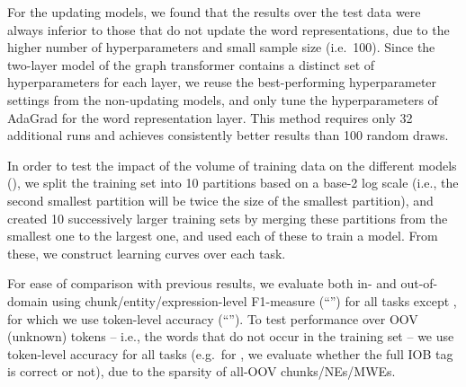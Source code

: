 For the updating models, we found that the results over the test data
were always inferior to those that do not update the word
representations, due to the higher number of hyperparameters and small
sample size (i.e.\ 100).
Since the two-layer model of the graph transformer contains a distinct
set of hyperparameters for each layer, we reuse the best-performing
hyperparameter settings from the non-updating models, and only tune the
hyperparameters of AdaGrad for the word representation layer. 
This method requires only 32 additional runs and achieves consistently
better results than 100 random draws.

In order to test the impact of the volume of training data on the
different models (\RQ[3]), we split the training set into 10 partitions based on
a base-2 log scale (i.e., the second smallest partition will be twice
the size of the smallest partition), and created 10 successively larger
training sets by merging these partitions from the smallest one to the
largest one, and used each of these to train a model.
From these, we construct learning curves over each task.

For ease of comparison with previous results, we evaluate both
in- and out-of-domain using 
chunk/entity/expression-level F1-measure (``\fscore'') for all tasks except \pos,
for which we use token-level accuracy (``\accuracy'').
To test performance over OOV (unknown) tokens -- i.e., the words that do
not occur in the training set -- we use token-level accuracy for all
tasks (e.g.\ for \chunking, we evaluate whether the full IOB tag is
correct or not), due to the sparsity of all-OOV chunks/NEs/MWEs.



